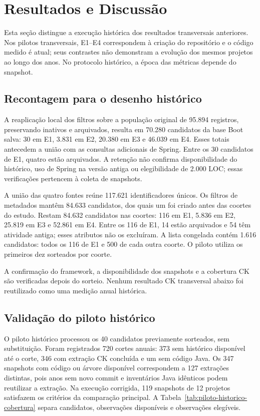 \section{Resultados e Discussão}
\label{sec:resultados}

Esta seção distingue a execução histórica dos resultados transversais anteriores. Nos pilotos transversais, E1--E4 correspondem à criação do repositório e o código medido é atual; seus contrastes não demonstram a evolução dos mesmos projetos ao longo dos anos. No protocolo histórico, a época das métricas depende do snapshot.

\subsection{Recontagem para o desenho histórico}

A reaplicação local dos filtros sobre a população original de 95.894 registros, preservando inativos e arquivados, resulta em 70.280 candidatos da base Boot salva: 30 em E1, 3.831 em E2, 20.380 em E3 e 46.039 em E4. Esses totais antecedem a união com as consultas adicionais de Spring. Entre os 30 candidatos de E1, quatro estão arquivados. A retenção não confirma disponibilidade do histórico, uso de Spring na versão antiga ou elegibilidade de 2.000 LOC; essas verificações pertencem à coleta de snapshots.

A união das quatro fontes reúne 117.621 identificadores únicos. Os filtros de metadados mantêm 84.633 candidatos, dos quais um foi criado antes das coortes do estudo. Restam 84.632 candidatos nas coortes: 116 em E1, 5.836 em E2, 25.819 em E3 e 52.861 em E4. Entre os 116 de E1, 14 estão arquivados e 54 têm atividade antiga; esses atributos não os excluíram. A lista congelada contém 1.616 candidatos: todos os 116 de E1 e 500 de cada outra coorte. O piloto utiliza os primeiros dez sorteados por coorte.

A confirmação do framework, a disponibilidade dos snapshots e a cobertura CK são verificadas depois do sorteio. Nenhum resultado CK transversal abaixo foi reutilizado como uma medição anual histórica.

\subsection{Validação do piloto histórico}
\label{subsec:piloto-historico}

O piloto histórico processou os 40 candidatos previamente sorteados, sem substituição. Foram registrados 720 cortes anuais: 373 sem histórico disponível até o corte, 346 com extração CK concluída e um sem código Java. Os 347 snapshots com código ou árvore disponível correspondem a 127 extrações distintas, pois anos sem novo commit e inventários Java idênticos podem reutilizar a extração. Na execução corrigida, 119 snapshots de 12 projetos satisfazem os critérios da comparação principal. A Tabela~\ref{tab:piloto-historico-cobertura} separa candidatos, observações disponíveis e observações elegíveis.

